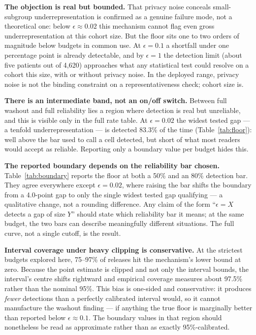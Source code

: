 \documentclass[11pt]{article}
\begin{document}
\textbf{The objection is real but bounded.} That privacy noise conceals small-subgroup underrepresentation is confirmed as a genuine failure mode, not a theoretical one: below $\epsilon \approx 0.02$ this mechanism cannot flag even gross underrepresentation at this cohort size. But the floor sits one to two orders of magnitude below budgets in common use. At $\epsilon = 0.1$ a shortfall under one percentage point is already detectable, and by $\epsilon = 1$ the detection limit (about five patients out of 4,620) approaches what any statistical test could resolve on a cohort this size, with or without privacy noise. In the deployed range, privacy noise is not the binding constraint on a representativeness check; cohort size is.

\textbf{There is an intermediate band, not an on/off switch.} Between full washout and full reliability lies a region where detection is real but unreliable, and this is visible only in the full rate table. At $\epsilon = 0.02$ the widest tested gap --- a tenfold underrepresentation --- is detected 83.3\% of the time (Table~\ref{tab:floor}): well above the bar used to call a cell detected, but short of what most readers would accept as reliable. Reporting only a boundary value per budget hides this.

\textbf{The reported boundary depends on the reliability bar chosen.} Table~\ref{tab:boundary} reports the floor at both a 50\% and an 80\% detection bar. They agree everywhere except $\epsilon = 0.02$, where raising the bar shifts the boundary from a 4.0-point gap to only the single widest tested gap qualifying --- a qualitative change, not a rounding difference. Any claim of the form ``$\epsilon = X$ detects a gap of size $Y$'' should state which reliability bar it means; at the same budget, the two bars can describe meaningfully different situations. The full curve, not a single cutoff, is the result.

\textbf{Interval coverage under heavy clipping is conservative.} At the strictest budgets explored here, 75--97\% of releases hit the mechanism's lower bound at zero. Because the point estimate is clipped and not only the interval bounds, the interval's centre shifts rightward and empirical coverage measures about 97.5\% rather than the nominal 95\%. This bias is one-sided and conservative: it produces \emph{fewer} detections than a perfectly calibrated interval would, so it cannot manufacture the washout finding --- if anything the true floor is marginally better than reported below $\epsilon \approx 0.1$. The boundary values in that region should nonetheless be read as approximate rather than as exactly 95\%-calibrated.
\end{document}

